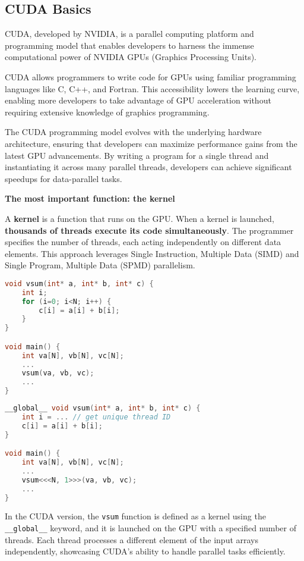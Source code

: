 \subsection{CUDA Basics}

CUDA, developed by NVIDIA, is a parallel computing platform and programming model that enables developers to harness the immense computational power of NVIDIA GPUs (Graphics Processing Units).

\highspace
CUDA allows programmers to write code for GPUs using familiar programming languages like C, C++, and Fortran. This accessibility lowers the learning curve, enabling more developers to take advantage of GPU acceleration without requiring extensive knowledge of graphics programming.

\highspace
The CUDA programming model evolves with the underlying hardware architecture, ensuring that developers can maximize performance gains from the latest GPU advancements. By writing a program for a single thread and instantiating it across many parallel threads, developers can achieve significant speedups for data-parallel tasks.

\highspace
\begin{flushleft}
    \textcolor{Green3}{ \textbf{The most important function: the kernel}}
\end{flushleft}
A \textbf{kernel} is a function that runs on the GPU. When a kernel is launched, \textbf{thousands of threads execute its code simultaneously}. The programmer specifies the number of threads, each acting independently on different data elements. This approach leverages Single Instruction, Multiple Data (SIMD) and Single Program, Multiple Data (SPMD) parallelism.

\begin{examplebox}
    \begin{lstlisting}[language=C]
void vsum(int* a, int* b, int* c) {
    int i;
    for (i=0; i<N; i++) {
        c[i] = a[i] + b[i];
    }
}

void main() {
    int va[N], vb[N], vc[N];
    ...
    vsum(va, vb, vc);
    ...
}
    \end{lstlisting}
    \begin{lstlisting}[language=C]
__global__ void vsum(int* a, int* b, int* c) {
    int i = ... // get unique thread ID
    c[i] = a[i] + b[i];
}

void main() {
    int va[N], vb[N], vc[N];
    ...
    vsum<<<N, 1>>>(va, vb, vc);
    ...
}
    \end{lstlisting}
    In the CUDA version, the \texttt{vsum} function is defined as a kernel using the \texttt{\_\_global\_\_} keyword, and it is launched on the GPU with a specified number of threads. Each thread processes a different element of the input arrays independently, showcasing CUDA's ability to handle parallel tasks efficiently.
\end{examplebox}
